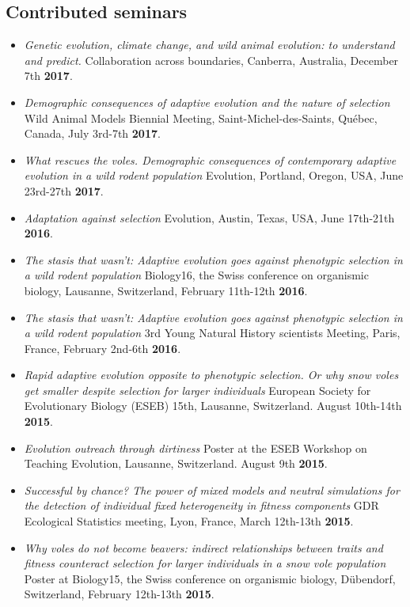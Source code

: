\documentclass[a4paper,10pt]{article} %
\begin{document}
\subsection*{Contributed seminars}
\begin{itemize}
\item \textit{Genetic evolution, climate change, and wild animal evolution: to understand and predict.} Collaboration across boundaries, Canberra, Australia, December 7th \textbf{2017}.
\item \textit{Demographic consequences of adaptive evolution and the nature of selection}  Wild Animal Models Biennial Meeting, Saint-Michel-des-Saints, Québec, Canada, July 3rd-7th  \textbf{2017}.
\item \textit{What rescues the voles. Demographic consequences of contemporary adaptive evolution in a
wild rodent population} Evolution, Portland, Oregon, USA, June 23rd-27th \textbf{2017}.
\item \textit{Adaptation against selection} Evolution, Austin, Texas, USA, June 17th-21th \textbf{2016}.
\item \textit{The stasis that wasn't: Adaptive evolution goes against phenotypic selection in a wild rodent population} Biology16, the Swiss conference on organismic biology, Lausanne, Switzerland, February 11th-12th \textbf{2016}.
\item \textit{The stasis that wasn't: Adaptive evolution goes against phenotypic selection in a wild rodent population} 3rd Young Natural History scientists Meeting, Paris, France, February 2nd-6th \textbf{2016}.
\item \textit{Rapid adaptive evolution opposite to phenotypic selection. Or why snow voles get smaller despite selection for larger individuals} European Society for Evolutionary Biology (ESEB) 15th, Lausanne, Switzerland. August 10th-14th \textbf{2015}.
\item \textit{Evolution outreach through dirtiness} Poster at the ESEB Workshop on Teaching Evolution, Lausanne, Switzerland. August 9th \textbf{2015}.
\item \textit{Successful by chance? The power of mixed models and neutral simulations for the detection of individual fixed heterogeneity in fitness components} GDR Ecological Statistics meeting, Lyon, France, March 12th-13th \textbf{2015}.
\item \textit{Why voles do not become beavers: indirect relationships between traits and fitness counteract selection for larger individuals in a snow vole population} Poster at Biology15, the Swiss conference on organismic biology, D\"{u}bendorf, Switzerland, February 12th-13th \textbf{2015}.

\end{itemize}
\end{document}

